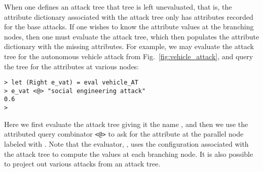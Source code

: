 When one defines an attack tree that tree is left unevaluated, that
is, the attribute dictionary associated with the attack tree only has
attributes recorded for the base attacks.  If one wishes to know the
attribute values at the branching nodes, then one must evaluate the
attack tree, which then populates the attribute dictionary with the
missing attributes.  For example, we may evaluate the attack tree for
the autonomous vehicle attack from Fig.~\ref{fig:vehicle_attack}, and
query the tree for the attributes at various nodes:
\begin{mdframed}
\scriptsize
\begin{verbatim}
> let (Right e_vat) = eval vehicle_AT
> e_vat <@> "social engineering attack"
0.6
> 
\end{verbatim}  
\end{mdframed}
Here we first evaluate the attack tree  giving it the
name , and then we use the attributed query combinator
\verb!<@>! to ask for the attribute at the parallel node labeled with
. Note that the evaluator, ,
uses the configuration associated with the attack tree to compute the
values at each branching node.  It is also possible to project out
various attacks from an attack tree.

